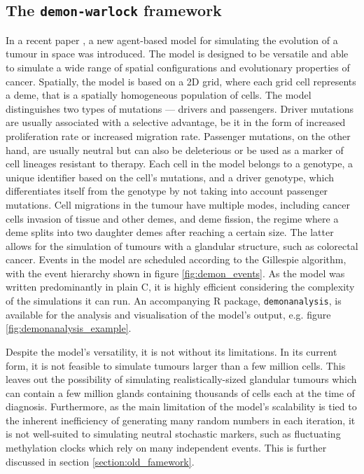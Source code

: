 \subsection{The \texttt{demon-warlock} framework}
In a recent paper \cite{bak_warlock_2023}, a new agent-based model for
simulating the evolution of a tumour in space was introduced. The model is
designed to be versatile and able to simulate a wide range of spatial
configurations and evolutionary properties of cancer. Spatially, the model is
based on a 2D grid, where each grid cell represents a deme, that is a spatially
homogeneous population of cells. The model distinguishes two types of mutations
--- drivers and passengers. Driver mutations are usually associated with a
selective advantage, be it in the form of increased proliferation rate or
increased migration rate. Passenger mutations, on the other hand, are usually
neutral but can also be deleterious or be used as a marker of cell lineages
resistant to therapy. Each cell in the model belongs to a genotype, a unique
identifier based on the cell's mutations, and a driver genotype, which
differentiates itself from the genotype by not taking into account passenger
mutations. Cell migrations in the tumour have multiple modes, including cancer
cells invasion of tissue and other demes, and deme fission, the regime where a
deme splits into two daughter demes after reaching a certain size. The latter
allows for the simulation of tumours with a glandular structure, such as
colorectal cancer. Events in the model are scheduled according to the Gillespie
algorithm, with the event hierarchy shown in figure \ref{fig:demon_events}. As
the model was written predominantly in plain C, it is highly efficient
considering the complexity of the simulations it can run. An accompanying R
package, \texttt{demonanalysis}, is available for the analysis and
visualisation of the model's output, e.g. figure
\ref{fig:demonanalysis_example}. \par
Despite the model's versatility, it is not without its limitations. In its
current form, it is not feasible to simulate tumours larger than a few million
cells. This leaves out the possibility of simulating realistically-sized
glandular tumours which can contain a few million glands containing thousands
of cells each at the time of diagnosis. Furthermore, as the main limitation of
the model's scalability is tied to the inherent inefficiency of generating many
random numbers in each iteration, it is not well-suited to simulating neutral
stochastic markers, such as fluctuating methylation clocks
\cite{gabbutt_fluctuating_2022} which rely on many independent events. This is
further discussed in section \ref{section:old_famework}.

